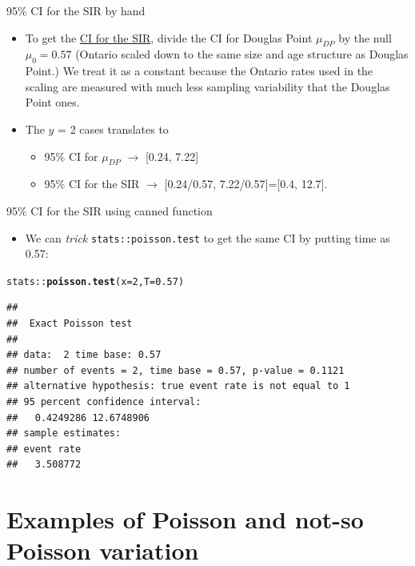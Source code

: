 \documentclass[handout]{beamer}\usepackage[]{graphicx}\usepackage[]{color}
\newcommand{\hlnum}[1]{\textcolor[rgb]{0.686,0.059,0.569}{#1}}%
\newcommand{\hlopt}[1]{\textcolor[rgb]{0,0,0}{#1}}%
\newcommand{\hlstd}[1]{\textcolor[rgb]{0.345,0.345,0.345}{#1}}%
\newcommand{\hlkwc}[1]{\textcolor[rgb]{0.333,0.667,0.333}{#1}}%
\newcommand{\hlkwd}[1]{\textcolor[rgb]{0.737,0.353,0.396}{\textbf{#1}}}%
\newenvironment{knitrout}{}{} %
\begin{document}
\begin{frame}[fragile]{95\% CI for the SIR by hand}


\small
\begin{itemize}
\setlength\itemsep{1.2em}

\item To get the \underline{CI for the SIR}, divide the CI for Douglas Point $\mu_{DP}$ by the null $\mu_0 = 0.57$ (Ontario scaled down to the same size and age structure as Douglas Point.) We treat it as a constant because the Ontario rates used in the scaling are measured with much less sampling variability that the Douglas Point ones.

\pause 

\item The $y$ = 2 cases translates to
\begin{itemize}
\item 95\% CI for $\mu_{DP}$ $\to$ [0.24, 7.22]
\item 95\% CI for the SIR $\to$ [0.24/0.57, 7.22/0.57]=[0.4, 12.7].
\end{itemize}
\end{itemize}

\end{frame}



\begin{frame}[fragile]{95\% CI for the SIR using canned function}


\small
\begin{itemize}
\setlength\itemsep{1.2em}

\item We can \textit{trick}  \texttt{stats::poisson.test} 
to get the same CI by putting time as 0.57: 


\end{itemize}

\begin{knitrout}\scriptsize
{}\color{fgcolor}
\begin{alltt}
\hlstd{stats}\hlopt{::}\hlkwd{poisson.test}\hlstd{(}\hlkwc{x}\hlstd{=}\hlnum{2}\hlstd{,}\hlkwc{T}\hlstd{=}\hlnum{0.57}\hlstd{)}
\end{alltt}
\begin{verbatim}
## 
## 	Exact Poisson test
## 
## data:  2 time base: 0.57
## number of events = 2, time base = 0.57, p-value = 0.1121
## alternative hypothesis: true event rate is not equal to 1
## 95 percent confidence interval:
##   0.4249286 12.6748906
## sample estimates:
## event rate 
##   3.508772
\end{verbatim}

\end{knitrout}

\end{frame}


\section{Examples of Poisson and not-so Poisson variation}
\end{document}
